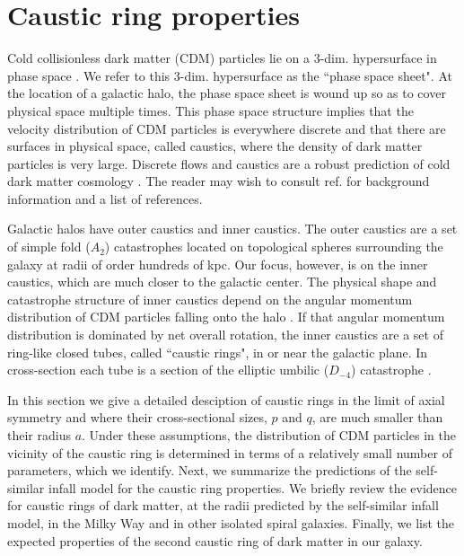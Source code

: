 \documentclass[aps,prd,preprint,tightenlines,floatfix,showpacs,groupedaddress]{revtex4}
\begin{document}
\section{Caustic ring properties}

Cold collisionless dark matter (CDM) particles lie on a 3-dim. 
hypersurface in phase space \cite{ipser,sing,Trem}.  We refer
to this 3-dim. hypersurface as the ``phase space sheet".  At the 
location of a galactic halo, the phase space sheet is wound up 
so as to cover physical space multiple times.  This phase space
structure implies that the velocity distribution of CDM particles 
is everywhere discrete and that there are surfaces in physical space, 
called caustics, where the density of dark matter particles is very 
large.  Discrete flows and caustics are a robust prediction of cold 
dark matter cosmology \cite{rob}.  The reader may wish to consult 
ref. \cite{rob} for background information and a list of references.

Galactic halos have outer caustics and inner caustics.  The outer 
caustics are a set of simple fold ($A_2$) catastrophes located on
topological spheres surrounding the galaxy at radii of order hundreds 
of kpc.  Our focus, however, is on the inner caustics, which are much 
closer to the galactic center.  The physical shape and catastrophe 
structure of inner caustics depend on the angular momentum distribution 
of CDM particles falling onto the halo \cite{inn}.  If that angular
momentum distribution is dominated by net overall rotation, the inner 
caustics are a set of ring-like closed tubes, called ``caustic rings", 
in or near the galactic plane.  In cross-section each tube is a section 
of the elliptic umbilic ($D_{-4}$) catastrophe \cite{sing}.  

In this section we give a detailed desciption of caustic rings in the 
limit of axial symmetry and where their cross-sectional sizes, $p$ and 
$q$, are much smaller than their radius $a$.  Under these assumptions, 
the distribution of CDM particles in the vicinity of the caustic ring 
is determined in terms of a relatively small number of parameters, which 
we identify.  Next, we summarize the predictions of the self-similar infall 
model for the caustic ring properties.  We briefly review the evidence for
caustic rings of dark matter, at the radii predicted by the self-similar 
infall model, in the Milky Way and in other isolated spiral galaxies.  
Finally, we list the expected properties of the second caustic ring of 
dark matter in our galaxy.
\end{document}
